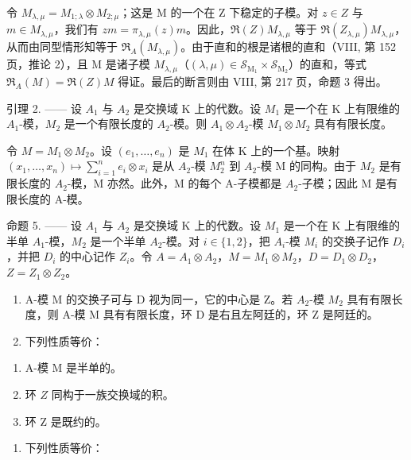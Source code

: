 令 \(M_{\lambda,\mu}=M_{1;\lambda}\otimes M_{2;\mu}\)；这是 M 的一个在 Z 下稳定的子模。对 \(z\in Z\) 与 \(m\in M_{\lambda,\mu}\)，我们有 \(zm=\pi_{\lambda,\mu}(z)m\)。因此，\(\Re(Z)M_{\lambda,\mu}\) 等于 \(\Re(Z_{\lambda,\mu})M_{\lambda,\mu}\)，从而由同型情形知等于 \(\Re_{A}(M_{\lambda,\mu})\)。由于直和的根是诸根的直和（VIII, 第 152 页，推论 2），且 M 是诸子模 \(M_{\lambda,\mu}\)（\((\lambda,\mu)\in\mathcal{S}_{\mathrm{M}_{1}}\times\mathcal{S}_{\mathrm{M}_{2}}\)）的直和，等式 \(\Re_{A}(M)=\Re(Z)M\) 得证。最后的断言则由 VIII, 第 217 页，命题 3 得出。

引理 2. —— 设 \(A_{1}\) 与 \(A_{2}\) 是交换域 K 上的代数。设 \(M_{1}\) 是一个在 K 上有限维的 \(A_{1}\)-模，\(M_{2}\) 是一个有限长度的 \(A_{2}\)-模。则 \(A_{1} \otimes A_{2}\)-模 \(M_{1} \otimes M_{2}\) 具有有限长度。

令 \(M = M_{1} \otimes M_{2}\)。设 \((e_{1}, \ldots, e_{n})\) 是 \(M_{1}\) 在体 K 上的一个基。映射 \((x_{1}, \ldots, x_{n}) \mapsto \sum_{i=1}^{n} e_{i} \otimes x_{i}\) 是从 \(A_{2}\)-模 \(M_{2}^{n}\) 到 \(A_{2}\)-模 M 的同构。由于 \(M_{2}\) 是有限长度的 \(A_{2}\)-模，M 亦然。此外，M 的每个 A-子模都是 \(A_{2}\)-子模；因此 M 是有限长度的 A-模。

命题 5. —— 设 \(A_{1}\) 与 \(A_{2}\) 是交换域 K 上的代数。设 \(M_{1}\) 是一个在 K 上有限维的半单 \(A_{1}\)-模，\(M_{2}\) 是一个半单 \(A_{2}\)-模。对 \(i \in \{1,2\}\)，把 \(A_{i}\)-模 \(M_{i}\) 的交换子记作 \(D_{i}\)，并把 \(D_{i}\) 的中心记作 \(Z_{i}\)。令 \(A = A_{1} \otimes A_{2}\)，\(M = M_{1} \otimes M_{2}\)，\(D = D_{1} \otimes D_{2}\)，\(Z = Z_{1} \otimes Z_{2}\)。

\begin{enumerate}
\def\labelenumi{\alph{enumi})}
\item
  A-模 M 的交换子可与 D 视为同一，它的中心是 Z。若 \(A_{2}\)-模 \(M_{2}\) 具有有限长度，则 A-模 M 具有有限长度，环 D 是右且左阿廷的，环 Z 是阿廷的。
\item
  下列性质等价：
\end{enumerate}

\begin{enumerate}
\def\labelenumi{(\roman{enumi})}
\item
  A-模 M 是半单的。
\item
  环 \(Z\) 同构于一族交换域的积。
\item
  环 Z 是既约的。
\end{enumerate}

\begin{enumerate}
\def\labelenumi{\alph{enumi})}
\setcounter{enumi}{2}
\tightlist
\item
  下列性质等价：
\end{enumerate}

